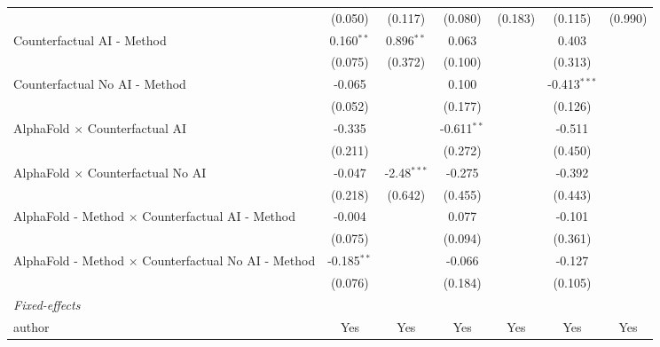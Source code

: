 \begin{tabular}{lcccccc}
                                                              & (0.050)       & (0.117)       & (0.080)       & (0.183)    & (0.115)        & (0.990)\\   
   Counterfactual AI - Method                                 & 0.160$^{**}$  & 0.896$^{**}$  & 0.063         &            & 0.403          &   \\   
                                                              & (0.075)       & (0.372)       & (0.100)       &            & (0.313)        &   \\   
   Counterfactual No AI - Method                              & -0.065        &               & 0.100         &            & -0.413$^{***}$ &   \\   
                                                              & (0.052)       &               & (0.177)       &            & (0.126)        &   \\   
   AlphaFold $\times$ Counterfactual AI                       & -0.335        &               & -0.611$^{**}$ &            & -0.511         &   \\   
                                                              & (0.211)       &               & (0.272)       &            & (0.450)        &   \\   
   AlphaFold $\times$ Counterfactual No AI                    & -0.047        & -2.48$^{***}$ & -0.275        &            & -0.392         &   \\   
                                                              & (0.218)       & (0.642)       & (0.455)       &            & (0.443)        &   \\   
   AlphaFold - Method $\times$ Counterfactual AI - Method     & -0.004        &               & 0.077         &            & -0.101         &   \\   
                                                              & (0.075)       &               & (0.094)       &            & (0.361)        &   \\   
   AlphaFold - Method $\times$ Counterfactual No AI - Method  & -0.185$^{**}$ &               & -0.066        &            & -0.127         &   \\   
                                                              & (0.076)       &               & (0.184)       &            & (0.105)        &   \\   
   \midrule
   \emph{Fixed-effects}\\
   author                                                     & Yes           & Yes           & Yes           & Yes        & Yes            & Yes\\  

\end{tabular}
